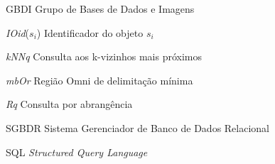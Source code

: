 

\begin{siglas}
    \item [GBDI] Grupo de Bases de Dados e Imagens
    \item [\textit{IOid}($s_i$)] Identificador do objeto $s_i$    
    \item[\textit{kNNq}] Consulta aos k-vizinhos mais próximos 
    \item [\textit{mbOr}] Região Omni de delimitação mínima 
    \item[\textit{Rq}] Consulta por abrangência
    \item[SGBDR] Sistema Gerenciador de Banco de Dados Relacional
    \item[SQL] \textit{Structured Query Language}
\end{siglas}


